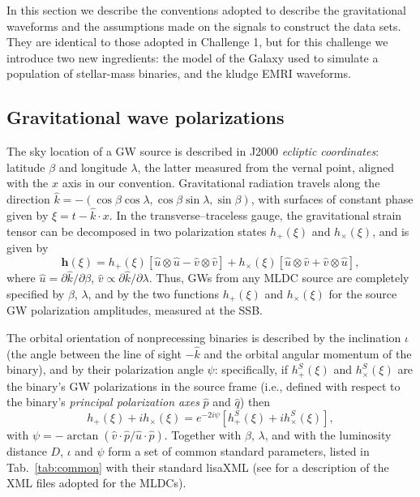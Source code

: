 \documentclass[12pt]{iopart}
\begin{document}
In this section we describe the conventions adopted to describe the gravitational waveforms and the assumptions made on the signals to construct the data sets. They are identical to those adopted in Challenge 1, but for this challenge we introduce two new ingredients: the model of the Galaxy used to simulate a population of stellar-mass binaries, and the kludge EMRI waveforms.

\subsection{Gravitational wave polarizations}
\label{ss:polarizations}

The sky location of a GW source is described in J2000 \emph{ecliptic coordinates}: latitude $\beta$ and longitude $\lambda$, the latter measured from the vernal point, aligned with the $\hat{x}$ axis in our convention. Gravitational radiation travels along the direction $\hat{k} = -(\cos \beta \cos \lambda, \cos \beta \sin \lambda, \sin \beta)$, with surfaces of constant phase given by $\xi = t - \hat{k} \cdot x$. In the transverse--traceless gauge, the gravitational strain tensor can be decomposed in two polarization states $h_{+}(\xi)$ and $h_{\times}(\xi)$, and is given by
%
\begin{equation}
\label{eq:defpol}
\mathbf{h}(\xi) = h_{+}(\xi) \left[ \hat{u}\otimes \hat{u} - \hat{v}\otimes \hat{v} \right] + h_{\times}(\xi) \left[ \hat{u}\otimes \hat{v} + \hat{v}\otimes \hat{u} \right],
\end{equation}
%
where $\hat{u} = \partial \hat{k} / \partial{\beta}$, $\hat{v} \propto \partial \hat{k} / \partial{\lambda}$. Thus, GWs from any MLDC source are completely specified by $\beta$, $\lambda$, and by the two functions $h_+(\xi)$ and $h_\times(\xi)$ for the source GW polarization amplitudes, measured at the SSB.

The orbital orientation of nonprecessing binaries is described by the inclination $\iota$ (the angle between the line of sight $-\hat{k}$ and the orbital angular momentum of the binary), and by their polarization angle $\psi$: specifically, if $h^S_{+}(\xi)$ and $h^S_\times(\xi)$ are the binary's GW polarizations in the source frame (i.e., defined with respect to the binary's \emph{principal polarization axes} $\hat{p}$ and $\hat{q}$) then 
%
\begin{equation}
h_+(\xi) + i h_\times(\xi) = e^{-2 i \psi} \left[ h^S_+(\xi) + i h^S_\times(\xi) \right],
\end{equation}
%
with $\psi = -\arctan(\hat{v} \cdot \hat{p} / \hat{u} \cdot \hat{p})$.
Together with $\beta$, $\lambda$, and with the luminosity distance $D$, $\iota$ and $\psi$ form a set of common standard parameters, listed in Tab.\ \ref{tab:common} with their standard lisaXML (see \cite{MLDCLISA06b} for a description of the XML files adopted for the MLDCs).
\end{document}
